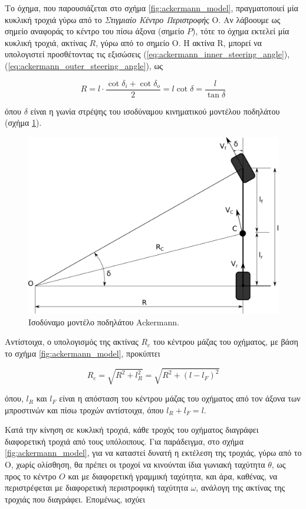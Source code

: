 \bigskip
Το όχημα, που παρουσιάζεται στο σχήμα \ref{fig:ackermann_model}, πραγματοποιεί μία κυκλική τροχιά γύρω από το \textit{Στιγμιαίο Κέντρο Περιστροφής} Ο. Αν λάβοουμε ως σημείο αναφοράς το κέντρο του πίσω άξονα (σημείο $P$), τότε το όχημα εκτελεί μία κυκλική τροχιά, ακτίνας $R$, γύρω από το σημείο O. Η ακτίνα R, μπορεί να υπολογιστεί προσθέτοντας τις εξισώσεις (\ref{eq:ackermann_inner_steering_angle}), (\ref{eq:ackermann_outer_steering_angle}), ως

\begin{equation}
	R = l \cdot \frac{\cot{\delta_i} + \cot{\delta_o}}{2} = l \cot{\delta} = \frac{l}{\tan{\delta}}
	\label{eq:ackermann_rear_middle_turning_radius}
\end{equation}

\noindent
όπου $\delta$ είναι η γωνία στρέψης του ισοδύναμου κινηματικού μοντέλου ποδηλάτου (σχήμα \ref{fig:ackermann_bicylce_model}). 

\begin{figure}[!ht]
	\centering
	\includegraphics[width=0.6\linewidth]{Chapters/Chapter2/Figures/ackermann_bicycle_model.png}
	\caption{Ισοδύναμο μοντέλο ποδηλάτου Ackermann.}
	\label{fig:ackermann_bicylce_model}
\end{figure}

\bigskip
Αντίστοιχα, ο υπολογισμός της ακτίνας $R_c$ του κέντρου μάζας του οχήματος, με βάση το σχήμα \ref{fig:ackermann_model}, προκύπτει 

\begin{equation}
	R_c = \sqrt{R^2 + l_R^2} = \sqrt{R^2 + (l - l_F)^2}
	\label{eq:ackermann_center_mass_turning_radius}
\end{equation}

\noindent
όπου, $l_R$ και $l_F$ είναι η απόσταση του κέντρου μάζας του οχήματος από τον άξονα των μπροστινών και πίσω τροχών αντίστοιχα, όπου $l_R + l_F = l$.

\bigskip
Κατά την κίνηση σε κυκλική τροχιά, κάθε τροχός του οχήματος διαγράφει διαφορετική τροχιά από τους υπόλοιπους. Για παράδειγμα, στο σχήμα \ref{fig:ackermann_model}, για να καταστεί δυνατή η εκτέλεση της τροχιάς, γύρω από το Ο, χωρίς ολίσθηση, θα πρέπει οι τροχοί να κινούνται ίδια γωνιακή ταχύτητα $\dot\theta$, ως προς το κέντρο $O$ και με διαφορετική γραμμική ταχύτητα, και άρα, καθένας, να περιστρέφεται με διαφορετική περιστροφική ταχύτητα $\omega$, ανάλογη της ακτίνας της τροχιάς που διαγράφει. Επομένως, ισχύει

